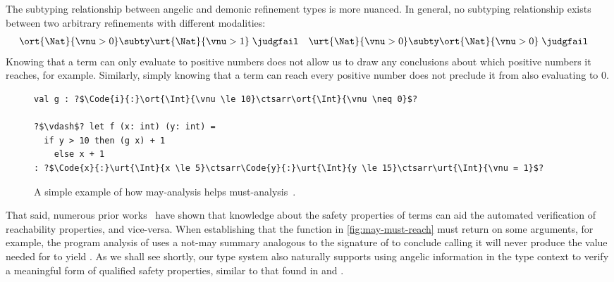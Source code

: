 The subtyping relationship between angelic and demonic refinement
types is more nuanced. In general, no subtyping relationship exists
between two arbitrary refinements with different modalities:
\begin{align*}
  &\ort{\Nat}{\vnu > 0} \subty \urt{\Nat}{\vnu > 1}\;\judgfail
  & &\urt{\Nat}{\vnu > 0} \subty \ort{\Nat}{\vnu > 0} \;\judgfail
\end{align*}\noindent
Knowing that a term can only evaluate to positive numbers does not
allow us to draw any conclusions about which positive numbers it
reaches, for example. Similarly, simply knowing that a term can reach
every positive number does not preclude it from also evaluating to 0.
\begin{figure}
  \centering
  \begin{verbatim}
val g : ?$\Code{i}{:}\ort{\Int}{\vnu \le 10}\ctsarr\ort{\Int}{\vnu \neq 0}$?

?$\vdash$? let f (x: int) (y: int) =
  if y > 10 then (g x) + 1
    else x + 1
: ?$\Code{x}{:}\urt{\Int}{x \le 5}\ctsarr\Code{y}{:}\urt{\Int}{y \le 15}\ctsarr\urt{\Int}{\vnu = 1}$?
  \end{verbatim}
  \caption{A simple example of how may-analysis helps
    must-analysis~\cite{CompositionalMayMust}.}
  \label{fig:may-must-reach}
\end{figure}
That said, numerous prior works~\cite{...} have shown that knowledge
about the safety properties of terms can aid the automated
verification of reachability properties, and vice-versa. When
establishing that the function  in
\autoref{fig:may-must-reach} must return  on some arguments,
for example, the program analysis of \citet{CompositionalMayMust} uses
a not-may summary analogous to the signature of  to conclude
calling it will never produce the  value needed for 
to yield . As we shall see shortly, our type system also
naturally supports using angelic information in the type context to
verify a meaningful form of qualified safety properties, similar to
that found in \citet{ZDS23} and \citet{RHLE}.


